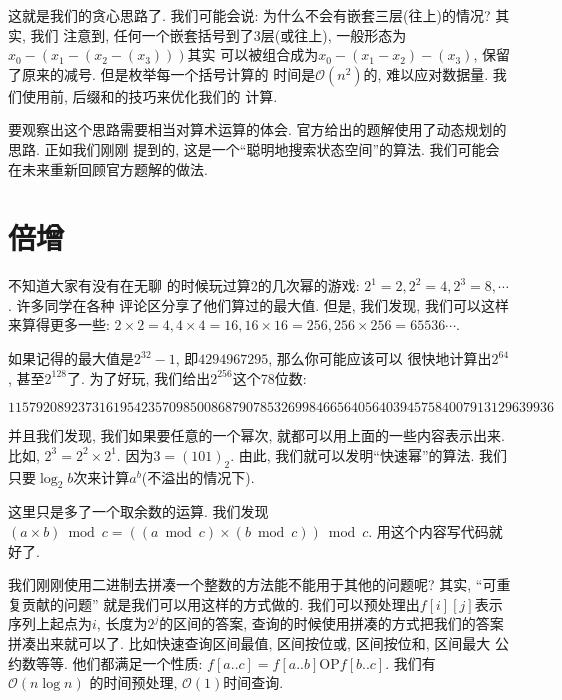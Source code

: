 这就是我们的贪心思路了. 我们可能会说: 为什么不会有嵌套三层(往上)的情况? 其实, 我们 
注意到, 任何一个嵌套括号到了3层(或往上), 一般形态为$x_0-(x_1-(x_2-(x_3)))$其实
可以被组合成为$x_0-(x_1-x_2)-(x_3)$, 保留了原来的减号. 但是枚举每一个括号计算的
时间是$\mathcal O(n^2)$的, 难以应对数据量. 我们使用前, 后缀和的技巧来优化我们的
计算. 

要观察出这个思路需要相当对算术运算的体会. 官方给出的题解使用了动态规划的思路. 
正如我们刚刚
提到的, 这是一个``聪明地搜索状态空间''的算法. 我们可能会在未来重新回顾官方题解的做法.

\section{倍增}

 不知道大家有没有在无聊
的时候玩过算2的几次幂的游戏: $2^1=2, 2^2=4, 2^3=8, \cdots$. 许多同学在各种
评论区分享了他们算过的最大值. 但是, 我们发现, 我们可以这样来算得更多一些: 
$2\times 2=4, 4\times 4 = 16, 16\times 16=256, 256\times 256=65536\cdots$. 

如果记得的最大值是$2^{32}-1$, 即$4294967295$, 那么你可能应该可以
很快地计算出$2^{64}$, 甚至$2^{128}$了. 为了好玩, 我们给出$2^{256}$这个78位数: 

$$
115792089237316195423570985008687907853269984665640564039457584007913129639936
$$

并且我们发现, 我们如果要任意的一个幂次, 就都可以用上面的一些内容表示出来. 比如, $2^3=2^2\times 2^1$.
因为$3=(101)_2$. 由此, 我们就可以发明``快速幂''的算法. 我们只要$\log_2 b$次来计算$a^b$(不溢出的情况下).

 这里只是多了一个取余数的运算. 我们发现
$(a\times b)\bmod c = ((a\bmod c)\times (b\bmod c))\bmod c$. 用这个内容写代码就好了. 


  我们刚刚使用二进制去拼凑一个整数的方法能不能用于其他的问题呢? 其实, ``可重复贡献的问题''
就是我们可以用这样的方式做的. 我们可以预处理出$f[i][j]$表示序列上起点为$i$, 长度为$2^j$的区间的答案, 
查询的时候使用拼凑的方式把我们的答案拼凑出来就可以了. 比如快速查询区间最值, 区间按位或, 区间按位和, 区间最大
公约数等等. 他们都满足一个性质: $f[a..c] = f[a..b] \text{OP} f[b..c]$. 我们有$\mathcal O(n\log n)$
的时间预处理, $\mathcal O(1)$时间查询. 

